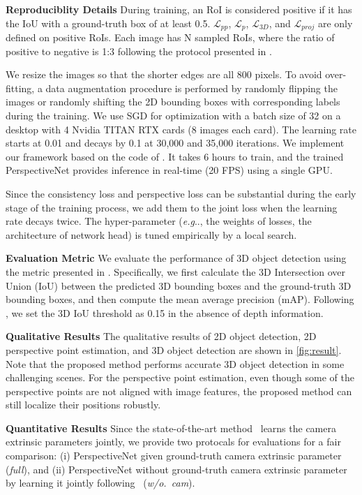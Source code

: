 \documentclass{article}
\makeatletter
\DeclareRobustCommand\onedot{\futurelet\@let@token\@onedot}
\def\@onedot{\ifx\@let@token.\else.\null\fi\xspace}
\def\eg{\emph{e.g}\onedot} \def\Eg{\emph{E.g}\onedot}
\makeatother
\begin{document}
\textbf{Reproduciblity Details}\quad{} During training, an RoI is considered positive if it has the IoU with a ground-truth box of at least 0.5. $\mathcal{L}_{pp}$, $\mathcal{L}_{p}$, $\mathcal{L}_{3D}$, and $\mathcal{L}_{proj}$ are only defined on positive RoIs. Each image has N sampled RoIs, where the ratio of positive to negative is 1:3 following the protocol presented in \citet{girshick2015fast}.

We resize the images so that the shorter edges are all 800 pixels. To avoid over-fitting, a data augmentation procedure is performed by randomly flipping the images or randomly shifting the 2D bounding boxes with corresponding labels during the training. We use SGD for optimization with a batch size of 32 on a desktop with 4 Nvidia TITAN RTX cards (8 images each card). The learning rate starts at 0.01 and decays by 0.1 at 30,000 and 35,000 iterations. We implement our framework based on the code of \citet{massa2018mrcnn}. It takes 6 hours to train, and the trained PerspectiveNet provides inference in real-time (20 FPS) using a single GPU.

Since the consistency loss and perspective loss can be substantial during the early stage of the training process, we add them to the joint loss when the learning rate decays twice. The hyper-parameter (\eg, the weights of losses, the architecture of network head) is tuned empirically by a local search.

\textbf{Evaluation Metric}\quad{} We evaluate the performance of 3D object detection using the metric presented in \citet{song2015sun}. Specifically, we first calculate the 3D Intersection over Union (IoU) between the predicted 3D bounding boxes and the ground-truth 3D bounding boxes, and then compute the mean average precision (mAP). Following \citet{huang2018cooperative}, we set the 3D IoU threshold as 0.15 in the absence of depth information. 

\textbf{Qualitative Results}\quad{} The qualitative results of 2D object detection, 2D perspective point estimation, and 3D object detection are shown in \autoref{fig:result}. Note that the proposed method performs accurate 3D object detection in some challenging scenes. For the perspective point estimation, even though some of the perspective points are not aligned with image features, the proposed method can still localize their positions robustly. 

\textbf{Quantitative Results}\quad{} Since the state-of-the-art method~\cite{huang2018cooperative} learns the camera extrinsic parameters jointly, we provide two protocals for evaluations for a fair comparison: (i) PerspectiveNet given ground-truth camera extrinsic parameter (\emph{full}), and (ii) PerspectiveNet without ground-truth camera extrinsic parameter by learning it jointly following~\cite{huang2018cooperative} (\emph{w/o.~cam}).
\end{document}

